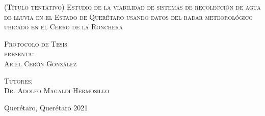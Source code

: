 \documentclass[letterpaper,12pt,oneside]{book}
\begin{document}
\begin{titlepage}
\begin{minipage}[c][0.81\textheight][t]{0.75\textwidth}
\begin{center}
                {\large\scshape (Título tentativo) Estudio de la viabilidad de sistemas de recolección de agua de lluvia en el Estado de Querétaro usando datos del radar meteorológico ubicado en el Cerro de la Ronchera}\\[.2in]

                \vspace{2cm}            

                \textsc{\large Protocolo de Tesis}\\[0.5cm]
                \textsc{\large presenta:}\\[0.5cm]
                \textsc{\large {Ariel Cerón González}}\\[2cm]          

                \vspace{0.5cm}

                {\large\scshape Tutores:\\[0.3cm] {Dr. Adolfo Magaldi Hermosillo}}\\[.2in]

                \vspace{0.5cm}

                \large{Querétaro, Querétaro}{ }{2021}
            \end{center}
        \end{minipage}
    \end{titlepage}



\frontmatter
\end{document}
